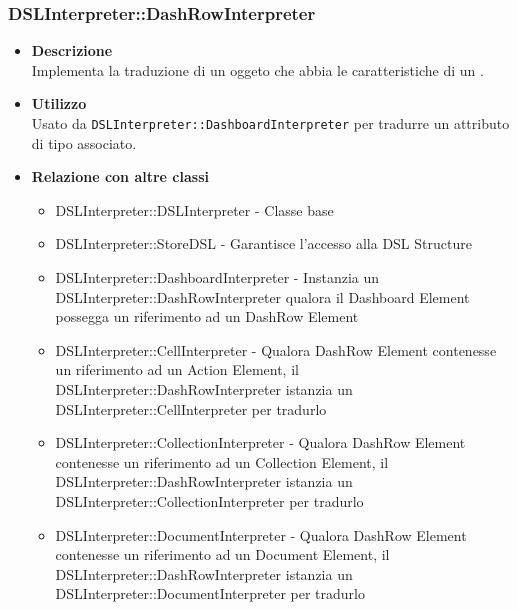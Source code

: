 \subsubsection{DSLInterpreter::DashRowInterpreter}
\begin{itemize}
\item \textbf{Descrizione} \hfill \\
Implementa la traduzione di un oggeto che abbia le caratteristiche di un .
\item \textbf{Utilizzo} \hfill \\
Usato da \texttt{DSLInterpreter::DashboardInterpreter} per tradurre un attributo di tipo  associato.
\item \textbf{Relazione con altre classi}
\begin{itemize}
\item DSLInterpreter::DSLInterpreter - Classe base
\item DSLInterpreter::StoreDSL - Garantisce l'accesso alla DSL Structure
\item DSLInterpreter::DashboardInterpreter - Instanzia un DSLInterpreter::DashRowInterpreter qualora il Dashboard Element possegga un riferimento ad un DashRow Element
\item DSLInterpreter::CellInterpreter - Qualora DashRow Element contenesse un riferimento ad un Action Element, il DSLInterpreter::DashRowInterpreter istanzia un DSLInterpreter::CellInterpreter per tradurlo
\item DSLInterpreter::CollectionInterpreter - Qualora DashRow Element contenesse un riferimento ad un Collection Element, il DSLInterpreter::DashRowInterpreter istanzia un DSLInterpreter::CollectionInterpreter per tradurlo
\item DSLInterpreter::DocumentInterpreter - Qualora DashRow Element contenesse un riferimento ad un Document Element, il DSLInterpreter::DashRowInterpreter istanzia un DSLInterpreter::DocumentInterpreter per tradurlo
\end{itemize}
\end{itemize}

